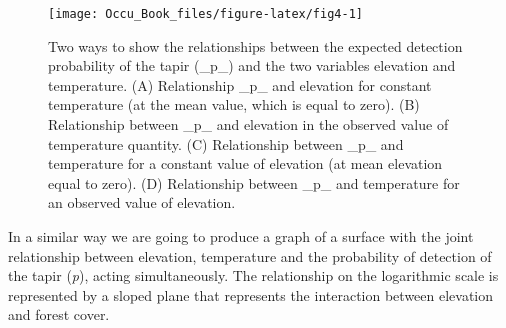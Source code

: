 \documentclass[
]{book}
\begin{document}
\begin{figure}
\texttt{[image: Occu\_Book\_files/figure-latex/fig4-1]} \caption[fig4]{Two ways to show the relationships between the expected detection probability of the tapir (_p_) and the two variables elevation and temperature. (A) Relationship _p_ and elevation for constant temperature (at the mean value, which is equal to zero). (B) Relationship between _p_ and elevation in the observed value of temperature quantity. (C) Relationship between _p_ and temperature for a constant value of elevation (at mean elevation equal to zero). (D) Relationship between _p_ and temperature for an observed value of elevation.}\label{fig:fig4}
\end{figure}

In a similar way we are going to produce a graph of a surface with the joint relationship between elevation, temperature and the probability of detection of the tapir (\emph{p}), acting simultaneously. The relationship on the logarithmic scale is represented by a sloped plane that represents the interaction between elevation and forest cover.
\end{document}
